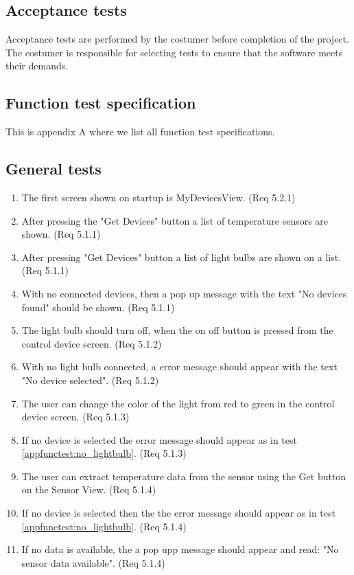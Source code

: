 \documentclass[a4paper]{article}
\newlength{\testlabellength}
\newenvironment{testlist}{\begin{enumerate}[label=\bfseries Test \thesubsection.\arabic* , labelindent=0pt, labelwidth=\testlabellength , leftmargin=2cm]}{\end{enumerate}}
\begin{document}
\subsection{Acceptance tests}
Acceptance tests are performed by the costumer before completion of the project. The costumer is responsible for selecting tests to ensure that the software meets their demands.

\newpage
\begin{appendices}

\section{Function test specification} \label{appendix:section:functiontest}
This is appendix A where we list all function test specifications.

\subsection{General tests}
%
%

\begin{testlist}
    \item The first screen shown on startup is MyDevicesView. (Req 5.2.1)
    \item After pressing the "Get Devices" button a list of temperature sensors are shown. (Req 5.1.1)
    \item After pressing  "Get Devices" button a list of light bulbs are shown on a list. (Req 5.1.1)
    \item With no connected devices, then a pop up message with the text "No devices found" should be shown. (Req 5.1.1)
    \item The light bulb should turn off, when the on off button is pressed from the control device screen. (Req 5.1.2)
    \item With no light bulb connected, a error message should appear with the text "No device selected". (Req 5.1.2) \label{appfunctest:no_lightbulb}
    \item The user can change the color of the light from red to green in the control device screen. (Req 5.1.3)
    \item If no device is selected the error message should appear as in test \ref{appfunctest:no_lightbulb}. (Req 5.1.3)
    \item The user can extract temperature data from the sensor using the Get button on the Sensor View. (Req 5.1.4)
    \item If no device is selected then the the error message should appear as in test \ref{appfunctest:no_lightbulb}. (Req 5.1.4)
    \item If no data is available, the a pop upp message should appear and read: "No sensor data available". (Req 5.1.4)
\end{testlist}


\end{appendices}
\end{document}
